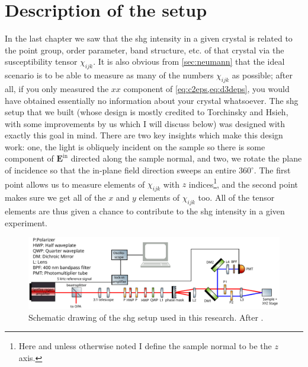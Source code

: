 \section{Description of the setup}\label{sec:setupdescription}

In the last chapter we saw that the \gls{shg} intensity in a given crystal is related to the point group, order parameter, band structure, etc. of that crystal via the susceptibility tensor $\chi_{ijk}$.
It is also obvious from \cref{sec:neumann} that the ideal scenario is to be able to measure as many of the numbers $\chi_{ijk}$ as possible; after all, if you only measured the $xx$ component of \cref{eq:c2eps,eq:d3deps}, you would have obtained essentially no information about your crystal whatsoever.
The \gls{shg} setup that we built (whose design is mostly credited to Torchinsky and Hsieh\citep{torchinsky_low_2014}, with some improvements by us which I will discuss below) was designed with exactly this goal in mind.
There are two key insights which make this design work: one, the light is obliquely incident on the sample so there is some component of $\bm{E}^\mathrm{in}$ directed along the sample normal, and two, we rotate the plane of incidence so that the in-plane field direction sweeps an entire $360^\circ$.
The first point allows us to measure elements of $\chi_{ijk}$ with $z$ indices\footnote{Here and unless otherwise noted I define the sample normal to be the $z$ axis.}, and the second point makes sure we get all of the $x$ and $y$ elements of $\chi_{ijk}$ too.
All of the tensor elements are thus given a chance to contribute to the \gls{shg} intensity in a given experiment.

\begin{figure}
\includegraphics[width=\textwidth]{gfx/ch3/pdf/setup.pdf}
\caption[Schematic drawing of the SHG setup used in this research.]{\label{fig:setup}Schematic drawing of the \gls{shg} setup used in this research. After \citet{morey_automated_2024}.}
\end{figure}

